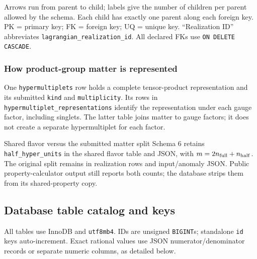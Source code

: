 \documentclass[11pt,a4paper]{article}
\numberwithin{equation}{section}
\newcommand{\code}[1]{{\small\nolinkurl{#1}}}
\begin{document}
{\small Arrows run from parent to child; labels give the number of children per
parent allowed by the schema. Each child has exactly one parent along each
foreign key. PK = primary key; FK = foreign key; UQ = unique key. ``Realization
ID'' abbreviates \code{lagrangian_realization_id}. All declared FKs use
\texttt{ON DELETE CASCADE}.}

\subsubsection{How product-group matter is represented}
One \code{hypermultiplets} row holds a complete tensor-product representation
and its submitted \code{kind} and \code{multiplicity}. Its rows in
\code{hypermultiplet_representations} identify the representation under each
gauge factor, including singlets. The latter table joins matter to gauge
factors; it does not create a separate hypermultiplet for each factor.

\begin{note}{Shared flavor versus the submitted matter split}
Schema 6 retains \code{half_hyper_units} in the shared flavor table and JSON,
with $m=2n_{\rm full}+n_{\rm half}$. The original split remains in realization
rows and input/anomaly JSON. Public property-calculator output still reports
both counts; the database strips them from its shared-property copy.
\end{note}

\clearpage
\subsection{Database table catalog and keys}\label{sec:db-tables}
All tables use InnoDB and \code{utf8mb4}. IDs are unsigned \code{BIGINT}s;
standalone \code{id} keys auto-increment. Exact rational values use JSON
numerator/denominator records or separate numeric columns, as detailed below.
\end{document}
